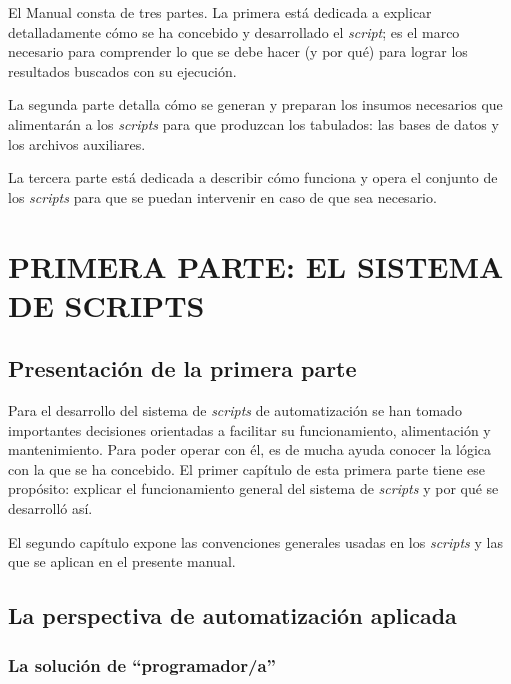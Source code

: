 \documentclass[
  spanish,
]{book}
\begin{document}
El Manual consta de tres partes. La primera está dedicada a explicar detalladamente cómo se ha concebido y desarrollado el \emph{script}; es el marco necesario para comprender lo que se debe hacer (y por qué) para lograr los resultados buscados con su ejecución.

La segunda parte detalla cómo se generan y preparan los insumos necesarios que alimentarán a los \emph{scripts} para que produzcan los tabulados: las bases de datos y los archivos auxiliares.

La tercera parte está dedicada a describir cómo funciona y opera el conjunto de los \emph{scripts} para que se puedan intervenir en caso de que sea necesario.

\hypertarget{part-primera-parte-el-sistema-de-scripts}{%
\part*{PRIMERA PARTE: EL SISTEMA DE SCRIPTS}\label{part-primera-parte-el-sistema-de-scripts}}

\hypertarget{presentaciuxf3n-de-la-primera-parte}{%
\chapter*{Presentación de la primera parte}\label{presentaciuxf3n-de-la-primera-parte}}

Para el desarrollo del sistema de \emph{scripts} de automatización se han tomado importantes decisiones orientadas a facilitar su funcionamiento, alimentación y mantenimiento. Para poder operar con él, es de mucha ayuda conocer la lógica con la que se ha concebido. El primer capítulo de esta primera parte tiene ese propósito: explicar el funcionamiento general del sistema de \emph{scripts} y por qué se desarrolló así.

El segundo capítulo expone las convenciones generales usadas en los \emph{scripts} y las que se aplican en el presente manual.

\hypertarget{la-perspectiva-de-automatizaciuxf3n-aplicada}{%
\chapter{La perspectiva de automatización aplicada}\label{la-perspectiva-de-automatizaciuxf3n-aplicada}}

\hypertarget{la-soluciuxf3n-de-programadora}{%
\section{La solución de ``programador/a''}\label{la-soluciuxf3n-de-programadora}}
\end{document}
